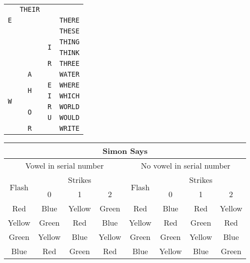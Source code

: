 \documentclass[11pt]{article}
\begin{document}
\begin{multicols}{3}
\begin{tabular}{|ccc|c|}
    \multirow{3}{*}{\texttt{E}} & \texttt{THEIR} \\
                            & & & \texttt{THERE} \\
                            & & & \texttt{THESE} \\
\cline{3-4}
                            &                             &
    \multirow{2}{*}{\texttt{I}} & \texttt{THING} \\
                            & & & \texttt{THINK} \\
\cline{3-4}
                            &                             &
    \texttt{R}                  & \texttt{THREE} \\
\hline
\multirow{6}{*}{\texttt{W}} & \texttt{A} & & \texttt{WATER} \\
\cline{2-4}
                            & \multirow{2}{*}{\texttt{H}} & \texttt{E} & \texttt{WHERE} \\
\cline{3-4}
                            &                             & \texttt{I} & \texttt{WHICH} \\
\cline{2-4}
                            & \multirow{2}{*}{\texttt{O}} & \texttt{R} & \texttt{WORLD} \\
\cline{3-4}
                            &                             & \texttt{U} & \texttt{WOULD} \\
\cline{2-4}
                            & \texttt{R} & & \texttt{WRITE} \\
\hline
\end{tabular}

\end{multicols}

\begin{tabular}{|c|c|c|c||c|c|c|c|}
\hline
\multicolumn{8}{|c|}{Simon Says} \\
\hline
\multicolumn{4}{|c||}{Vowel in serial number} &
\multicolumn{4}{|c|}{No vowel in serial number} \\
\hline
\multirow{2}{*}{Flash} & \multicolumn{3}{|c||}{Strikes} &
\multirow{2}{*}{Flash} & \multicolumn{3}{|c|}{Strikes} \\
\cline{2-4}
\cline{6-8}
 & 0 & 1 & 2 &
 & 0 & 1 & 2 \\
\hline
Red & Blue & Yellow & Green &
Red & Blue & Red & Yellow \\
Yellow & Green & Red & Blue &
Yellow & Red & Green & Red \\
Green & Yellow & Blue & Yellow &
Green & Green & Yellow & Blue \\
Blue & Red & Green & Red &
Blue & Yellow & Blue & Green \\
\hline
\end{tabular}
\end{document}
